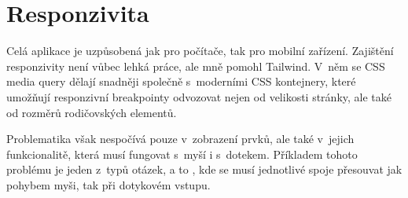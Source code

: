 \documentclass[12pt, a4paper,
openright
]{report}
\begin{document}
\section{Responzivita}
Celá aplikace je uzpůsobená jak pro počítače, tak pro mobilní zařízení. Zajištění responzivity není vůbec lehká práce, ale mně pomohl Tailwind. V~něm se CSS media query dělají snadněji společně s~moderními CSS kontejnery, které umožňují responzivní breakpointy odvozovat nejen od velikosti stránky, ale také od rozměrů rodičovských elementů.

Problematika však nespočívá pouze v~zobrazení prvků, ale také v~jejich funkcionalitě, která musí fungovat s~myší i s~dotekem. Příkladem tohoto problému je jeden z~typů otázek, a to , kde se musí jednotlivé spoje přesouvat jak pohybem myši, tak při dotykovém vstupu.
\end{document}
